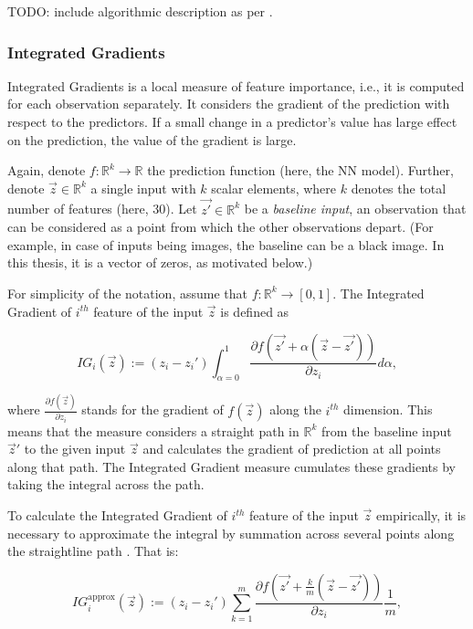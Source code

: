 			TODO: include algorithmic description as per \cite{molnar2020interpretable}.
		
			
		\subsubsection{Integrated Gradients}
			Integrated Gradients \citep{sundararajan2017axiomatic} is a local measure of feature importance, i.e., it is computed for each observation separately. It considers the gradient of the prediction with respect to the predictors. If a small change in a predictor's value has large effect on the prediction, the value of the gradient is large.
			
			Again, denote $f: \mathbb{R}^k \rightarrow \mathbb{R}$ the prediction function (here, the NN model). Further, denote $\vec{z} \in  \mathbb{R}^k$ a single input with $k$ scalar elements, where $k$ denotes the total number of features (here, 30). Let $\vec{z'} \in  \mathbb{R}^k$ be a \textit{baseline input}, an observation that can be considered as a point from which the other observations depart. (For example, in case of inputs being images, the baseline can be a black image. In this thesis, it is a vector of zeros, as motivated below.) 
			
			For simplicity of the notation, assume that $f: \mathbb{R}^k \rightarrow [0,1]$. The Integrated Gradient of $i^{th}$ feature of the input $\vec{z}$ is defined as 
			
			\begin{equation*}
				IG_i(\vec{z}) := (z_i - z_i') \int_{\alpha=0}^{1} \frac{\partial f(\vec{z'} + \alpha(\vec{z}-\vec{z'}))}{\partial z_i}d\alpha,
			\end{equation*}
			
			where $\frac{\partial f(\vec{z})}{\partial z_i}$ stands for the gradient of $f(\vec{z})$ along the $i^{th}$ dimension. This means that the measure considers a straight path in $\mathbb{R}^k$ from the baseline input ${\vec{z}'}$ to the given input ${\vec{z}}$ and calculates the gradient of prediction at all points along that path. The Integrated Gradient measure cumulates these gradients by taking the integral across the path.  
			
			To calculate the Integrated Gradient of $i^{th}$ feature of the input $\vec{z}$ empirically, it is necessary to approximate the integral by summation across several points along the straightline path  \citep{sundararajan2017axiomatic}. That is:  
			
			\begin{equation*}
				IG_i^{\text{approx}}(\vec{z}) := (z_i - z_i') \sum_{k=1}^{m} \frac{\partial f(\vec{z'} + \frac{k}{m}(\vec{z}-\vec{z'}))}{\partial z_i}\frac{1}{m},
			\end{equation*} 
	
